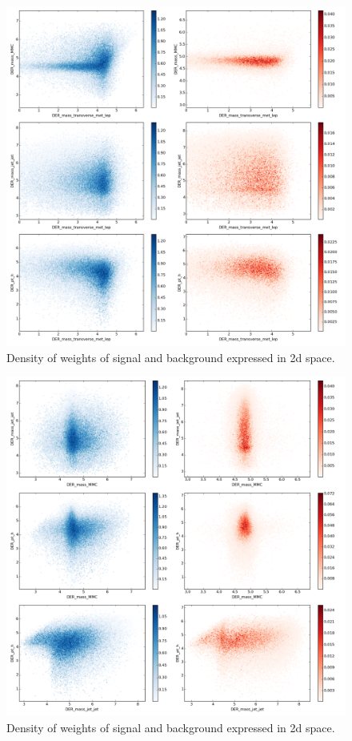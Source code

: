 \begin{figure}[ht]
\includegraphics[width=\textwidth]{images/scatter1.png}
\caption{Density of weights of signal and background expressed in 2d space.}
\label{scatter1}
\end{figure}

\begin{figure}[ht]
\includegraphics[width=\textwidth]{images/scatter2.png}
\caption{Density of weights of signal and background expressed in 2d space.}
\label{scatter2}
\end{figure}

